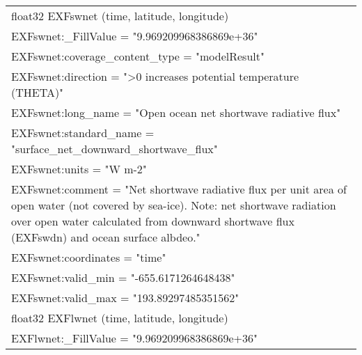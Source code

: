 \begin{longtable}{|p{\textwidth}|}
\hspace{0.5cm}float32 EXFswnet (time, latitude, longitude)\\
\hspace{0.5cm}\hspace{0.5cm}EXFswnet:\_FillValue = "9.969209968386869e+36"\\
\hspace{0.5cm}\hspace{0.5cm}EXFswnet:coverage\_content\_type = "modelResult"\\
\hspace{0.5cm}\hspace{0.5cm}EXFswnet:direction = ">0 increases potential temperature (THETA)"\\
\hspace{0.5cm}\hspace{0.5cm}EXFswnet:long\_name = "Open ocean net shortwave radiative flux"\\
\hspace{0.5cm}\hspace{0.5cm}EXFswnet:standard\_name = "surface\_net\_downward\_shortwave\_flux"\\
\hspace{0.5cm}\hspace{0.5cm}EXFswnet:units = "W m-2"\\
\hspace{0.5cm}\hspace{0.5cm}EXFswnet:comment = "Net shortwave radiative flux per unit area of open water (not covered by sea-ice). Note: net shortwave radiation over open water calculated from downward shortwave flux (EXFswdn) and ocean surface albdeo."\\
\hspace{0.5cm}\hspace{0.5cm}EXFswnet:coordinates = "time"\\
\hspace{0.5cm}\hspace{0.5cm}EXFswnet:valid\_min = "-655.6171264648438"\\
\hspace{0.5cm}\hspace{0.5cm}EXFswnet:valid\_max = "193.89297485351562"\\
\hspace{0.5cm}float32 EXFlwnet (time, latitude, longitude)\\
\hspace{0.5cm}\hspace{0.5cm}EXFlwnet:\_FillValue = "9.969209968386869e+36"\\

\end{longtable}
